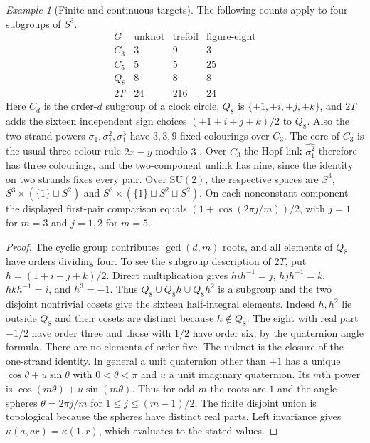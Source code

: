 \documentclass[11pt,reqno]{amsart}
\theoremstyle{definition}
\theoremstyle{remark}
\newtheorem{example}[theorem]{Example}
\numberwithin{equation}{section}
\newcommand{\SU}{\mathrm{SU}}
\begin{document}
\begin{example}[Finite and continuous targets]\label{m7:counts}
The following counts apply to four subgroups of $S^3$.
\[
\begin{array}{c|rrr}
G & \text{unknot}&\text{trefoil}&\text{figure-eight}\\ \hline
C_3&3&9&3\\
C_5&5&5&25\\
Q_8&8&8&8\\
2T&24&216&24
\end{array}
\]
Here $C_d$ is the order-$d$ subgroup of a clock circle, $Q_8$ is
$\{\pm1,\pm i,\pm j,\pm k\}$, and $2T$ adds the sixteen independent
sign choices $(\pm1\pm i\pm j\pm k)/2$ to $Q_8$. Also the
two-strand powers $\sigma_1,\sigma_1^2,\sigma_1^3$ have
$3,3,9$ fixed colourings over $C_3$. The core of $C_3$ is the usual
three-colour rule $2x-y$ modulo $3$ \cite{m7:Fox}.
Over $C_3$ the Hopf link $\widehat{\sigma_1^2}$ therefore has
three colourings, and the two-component unlink has nine, since
the identity on two strands fixes every pair.
Over $\SU(2)$, the respective spaces are $S^3$,
$S^3\times(\{1\}\sqcup S^2)$ and
$S^3\times(\{1\}\sqcup S^2\sqcup S^2)$.
On each nonconstant component the displayed first-pair comparison
equals $(1+\cos(2\pi j/m))/2$, with $j=1$ for $m=3$ and
$j=1,2$ for $m=5$.
\end{example}
\begin{proof}
The cyclic group contributes $\gcd(d,m)$ roots, and all elements of $Q_8$
have orders dividing four. To see the subgroup description of $2T$, put
$h=(1+i+j+k)/2$. Direct multiplication gives $hih^{-1}=j$,
$hjh^{-1}=k$, $hkh^{-1}=i$, and $h^3=-1$. Thus
$Q_8\cup Q_8h\cup Q_8h^2$ is a subgroup and the two disjoint
nontrivial cosets give the sixteen half-integral elements. Indeed $h,h^2$
lie outside $Q_8$ and their cosets are distinct because $h\notin Q_8$.
The eight with real part $-1/2$ have order three and those with $1/2$
have order six, by the quaternion angle formula. There are no elements
of order five. The unknot is the closure of the one-strand identity.
In general a unit quaternion other than $\pm1$ has a unique
$\cos\theta+u\sin\theta$ with $0<\theta<\pi$ and $u$ a unit imaginary
quaternion. Its $m$th power is $\cos(m\theta)+u\sin(m\theta)$.
Thus for odd $m$ the roots are $1$ and the angle spheres
$\theta=2\pi j/m$ for $1\le j\le(m-1)/2$. The finite disjoint union is
topological because the spheres have distinct real parts. Left
invariance gives $\kappa(a,ar)=\kappa(1,r)$, which evaluates to the
stated values.
\end{proof}
\end{document}
